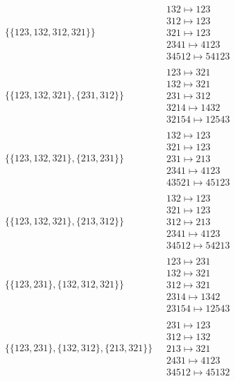 \begin{scriptsize}
\begin{align}
\begin{matrix}
\end{matrix}
\\
\{\{123, 132, 312, 321\}\}
\ 
&
\begin{matrix}
132 \mapsto 123\\312 \mapsto 123\\321 \mapsto 123\\2341 \mapsto 4123\\34512 \mapsto 54123
\end{matrix}
\\
\{\{123, 132, 321\}, \{231, 312\}\}
\ 
&
\begin{matrix}
123 \mapsto 321\\132 \mapsto 321\\231 \mapsto 312\\3214 \mapsto 1432\\32154 \mapsto 12543
\end{matrix}
\\
\{\{123, 132, 321\}, \{213, 231\}\}
\ 
&
\begin{matrix}
132 \mapsto 123\\321 \mapsto 123\\231 \mapsto 213\\2341 \mapsto 4123\\43521 \mapsto 45123
\end{matrix}
\\
\{\{123, 132, 321\}, \{213, 312\}\}
\ 
&
\begin{matrix}
132 \mapsto 123\\321 \mapsto 123\\312 \mapsto 213\\2341 \mapsto 4123\\34512 \mapsto 54213
\end{matrix}
\\
\{\{123, 231\}, \{132, 312, 321\}\}
\ 
&
\begin{matrix}
123 \mapsto 231\\132 \mapsto 321\\312 \mapsto 321\\2314 \mapsto 1342\\23154 \mapsto 12543
\end{matrix}
\\
\{\{123, 231\}, \{132, 312\}, \{213, 321\}\}
\ 
&
\begin{matrix}
231 \mapsto 123\\312 \mapsto 132\\213 \mapsto 321\\2431 \mapsto 4123\\34512 \mapsto 45132

\end{matrix}
\end{align}
\end{scriptsize}
